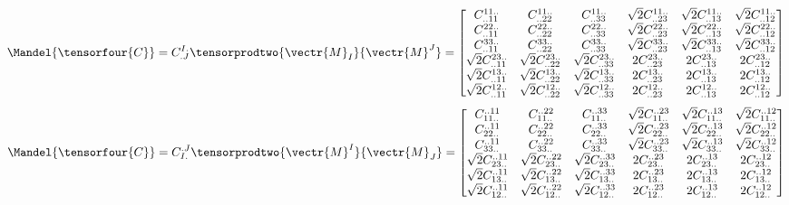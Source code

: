 \begin{equation}
  \Mandel{\tensorfour{C}}=C^{I.}_{.J}\tensorprodtwo{\vectr{M}_{I}}{\vectr{M}^{J}}=\begin{bmatrix}
    C^{11..}_{..11} & C^{11..}_{..22} & C^{11..}_{..33} & \sqrt{2}C^{11..}_{..23} & \sqrt{2}C^{11..}_{..13} & \sqrt{2}C^{11..}_{..12} \\
    C^{22..}_{..11} & C^{22..}_{..22} & C^{22..}_{..33} & \sqrt{2}C^{22..}_{..23} & \sqrt{2}C^{22..}_{..13} & \sqrt{2}C^{22..}_{..12} \\
    C^{33..}_{..11} & C^{33..}_{..22} & C^{33..}_{..33} & \sqrt{2}C^{33..}_{..23} & \sqrt{2}C^{33..}_{..13} & \sqrt{2}C^{33..}_{..12} \\
    \sqrt{2}C^{23..}_{..11} & \sqrt{2}C^{23..}_{..22} & \sqrt{2}C^{23..}_{..33} & 2C^{23..}_{..23} & 2C^{23..}_{..13} & 2C^{23..}_{..12} \\
    \sqrt{2}C^{13..}_{..11} & \sqrt{2}C^{13..}_{..22} & \sqrt{2}C^{13..}_{..33} & 2C^{13..}_{..23} & 2C^{13..}_{..13} & 2C^{13..}_{..12} \\
    \sqrt{2}C^{12..}_{..11} & \sqrt{2}C^{12..}_{..22} & \sqrt{2}C^{12..}_{..33} & 2C^{12..}_{..23} & 2C^{12..}_{..13} & 2C^{12..}_{..12}     
  \end{bmatrix}
\end{equation}
\begin{equation}
  \Mandel{\tensorfour{C}}=C^{.J}_{I.}\tensorprodtwo{\vectr{M}^{I}}{\vectr{M}_{J}}=\begin{bmatrix}
    C^{..11}_{11..} & C^{..22}_{11..} & C^{..33}_{11..} & \sqrt{2}C^{..23}_{11..} & \sqrt{2}C^{..13}_{11..} & \sqrt{2}C^{..12}_{11..} \\
    C^{..11}_{22..} & C^{..22}_{22..} & C^{..33}_{22..} & \sqrt{2}C^{..23}_{22..} & \sqrt{2}C^{..13}_{22..} & \sqrt{2}C^{..12}_{22..} \\
    C^{..11}_{33..} & C^{..22}_{33..} & C^{..33}_{33..} & \sqrt{2}C^{..23}_{33..} & \sqrt{2}C^{..13}_{33..} & \sqrt{2}C^{..12}_{33..} \\
    \sqrt{2}C^{..11}_{23..} & \sqrt{2}C^{..22}_{23..} & \sqrt{2}C^{..33}_{23..} & 2C^{..23}_{23..} & 2C^{..13}_{23..} & 2C^{..12}_{23..} \\
    \sqrt{2}C^{..11}_{13..} & \sqrt{2}C^{..22}_{13..} & \sqrt{2}C^{..33}_{13..} & 2C^{..23}_{13..} & 2C^{..13}_{13..} & 2C^{..12}_{13..} \\
    \sqrt{2}C^{..11}_{12..} & \sqrt{2}C^{..22}_{12..} & \sqrt{2}C^{..33}_{12..} & 2C^{..23}_{12..} & 2C^{..13}_{12..} & 2C^{..12}_{12..}     
  \end{bmatrix}
\end{equation}

